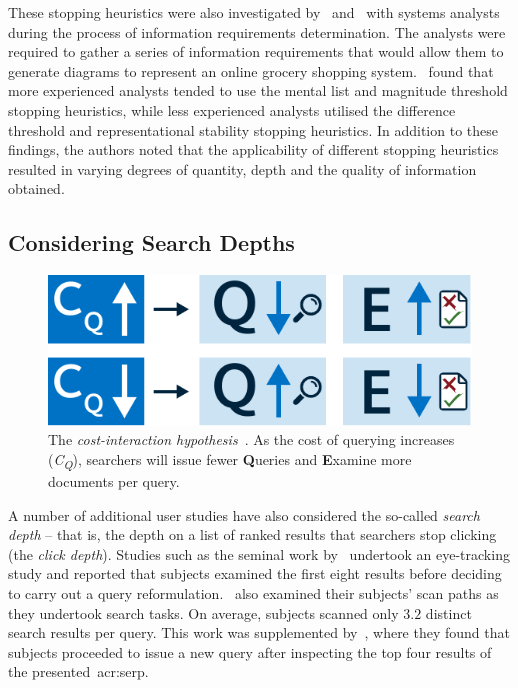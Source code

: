 These stopping heuristics were also investigated by~\cite{browne2004stopping_rules} and~\cite{pitts2004stopping_rules} with systems analysts during the process of information requirements determination. The analysts were required to gather a series of information requirements that would allow them to generate diagrams to represent an online grocery shopping system.~\cite{browne2004stopping_rules} found that more experienced analysts tended to use the mental list and magnitude threshold stopping heuristics, while less experienced analysts utilised the difference threshold and representational stability stopping heuristics. In addition to these findings, the authors noted that the applicability of different stopping heuristics resulted in varying degrees of quantity, depth and the quality of information obtained.

\subsection{Considering Search Depths}\label{sec:stopping_background:user_studies:depths}
\begin{figure}
    \begin{center}
    \vspace*{-7mm}
    \includegraphics[width=1\textwidth]{figures/ch3-query-cost.pdf}
    \end{center}
    \vspace*{-4mm}
    \caption[The cost-interaction hypothesis]{The \emph{cost-interaction hypothesis}~\citep{azzopardi2011economics}. As the cost of querying increases (\emph{C\textsubscript{Q}}), searchers will issue fewer \textbf{Q}ueries and \textbf{E}xamine more documents per query.}
    \label{fig:query_cost}
\end{figure}

A number of additional user studies have also considered the so-called \emph{search depth} -- that is, the depth on a list of ranked results that searchers stop clicking (the \emph{click depth}). Studies such as the seminal work by~\cite{cutrell2007eye_tracking} undertook an eye-tracking study and reported that subjects examined the first eight results before deciding to carry out a query reformulation.~\cite{lorigo2008eye_tracking} also examined their subjects' scan paths as they undertook search tasks. On average, subjects scanned only $3.2$ distinct search results per query. This work was supplemented by~\cite{huang2011no_clicks}, where they found that subjects proceeded to issue a new query after inspecting the top four results of the presented~\gls{acr:serp}.

